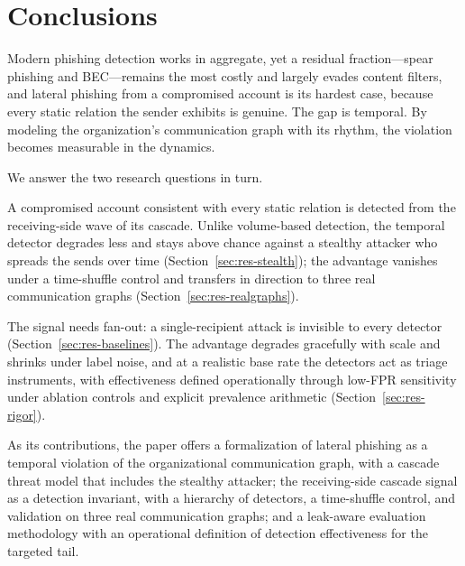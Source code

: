 \section{Conclusions}
\label{sec:conclusion}

Modern phishing detection works in aggregate, yet a residual fraction---spear phishing and BEC---remains the
most costly and largely evades content filters, and lateral phishing from a compromised account is its hardest
case, because every static relation the sender exhibits is genuine. The gap is temporal. By modeling the
organization's communication graph with its rhythm, the violation becomes measurable in the dynamics.

We answer the two research questions in turn.
\begin{description}[noitemsep,topsep=2pt]
  \item[RQ1 (signal, T1):] A compromised account consistent with every static relation is detected from the
  receiving-side wave of its cascade. Unlike volume-based detection, the temporal detector degrades less and
  stays above chance against a stealthy attacker who spreads the sends over time (Section~\ref{sec:res-stealth}); the
  advantage vanishes under a time-shuffle control and transfers in direction to three real communication graphs
  (Section~\ref{sec:res-realgraphs}).
  \item[RQ2 (limits, T2):] The signal needs fan-out: a single-recipient attack is invisible to every
  detector (Section~\ref{sec:res-baselines}). The advantage degrades gracefully with scale and shrinks under
  label noise, and at a realistic base rate the detectors act as triage instruments, with effectiveness defined
  operationally through low-FPR sensitivity under ablation controls and explicit prevalence arithmetic
  (Section~\ref{sec:res-rigor}).
\end{description}

As its contributions, the paper offers a formalization of lateral phishing as a temporal violation of the
organizational communication graph, with a cascade threat model that includes the stealthy attacker; the
receiving-side cascade signal as a detection invariant, with a hierarchy of detectors, a time-shuffle control, and
validation on three real communication graphs; and a leak-aware evaluation methodology with an operational
definition of detection effectiveness for the targeted tail.

